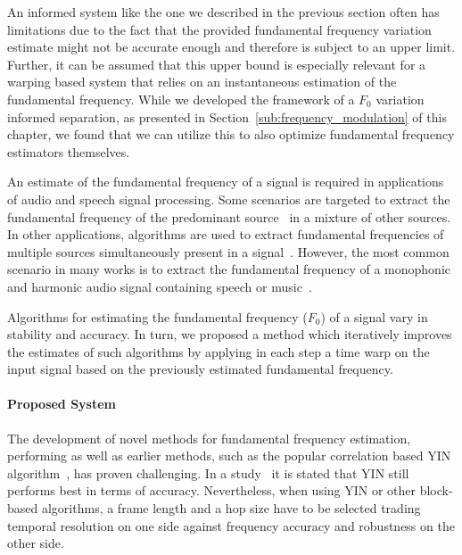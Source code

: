 


An informed system like the one we described in the previous section often has limitations due to the fact that the provided fundamental frequency variation estimate might not be accurate enough and therefore is subject to an upper limit.
Further, it can be assumed that this upper bound is especially relevant for a warping based system that relies on an instantaneous estimation of the fundamental frequency.
While we developed the framework of a $F_0$ variation informed separation, as presented in Section~\ref{sub:frequency_modulation} of this chapter, we found that we can utilize this to also optimize fundamental frequency estimators themselves.
\par
An estimate of the fundamental frequency of a signal is required in applications of audio and speech signal processing.
Some scenarios are targeted to extract the fundamental frequency of the predominant source~\cite{salamon12} in a mixture of other sources.
In other applications, algorithms are used to extract fundamental frequencies of multiple sources simultaneously present in a signal~\cite{klapuri03}.
However, the most common scenario in many works is to extract the fundamental frequency of a monophonic and harmonic audio signal containing speech or music~\cite{talkin95, boersma02, decheveigne02, resch07, tidhar10, christensen07}.
\par
Algorithms for estimating the fundamental frequency ($F_0$) of a signal vary in stability and accuracy.
In turn, we proposed a method which iteratively improves the estimates of such algorithms by applying in each step a time warp on the input signal based on the previously estimated fundamental frequency.

\paragraph{Proposed System}
%
The development of novel methods for fundamental frequency estimation, performing as well as earlier methods, such as the popular correlation based \textsc{YIN} algorithm~\cite{decheveigne02}, has proven challenging.
In a study~\cite{babacan13} it is stated that YIN still performs best in terms of accuracy.
Nevertheless, when using YIN or other block-based algorithms, a frame length and a hop size have to be selected trading temporal resolution on one side against frequency accuracy and robustness on the other side.

